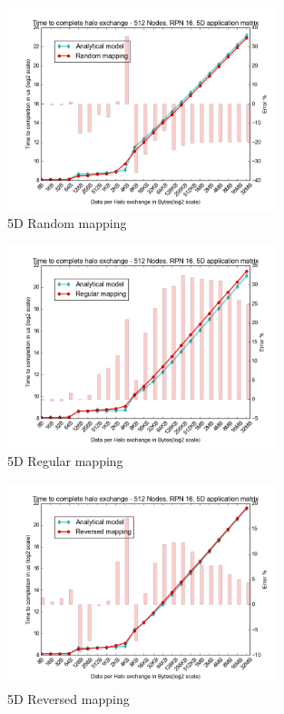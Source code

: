 \documentclass{beamer}
\begin{document}
\begin{frame}
\begin{figure}
\caption{5D Random mapping}
  \includegraphics[width=0.7\textwidth]{../mappings/5d_random_model.png}
\end{figure}
\end{frame}

\begin{frame}
\begin{figure}
\caption{5D Regular mapping}
  \includegraphics[width=0.7\textwidth]{../mappings/5d_regular_model.png}
\end{figure}
\end{frame}

\begin{frame}
\begin{figure}
\caption{5D Reversed mapping}
 \includegraphics[width=0.7\textwidth]{../mappings/5d_reversed_model.png}
\end{figure}
\end{frame}
\end{document}
